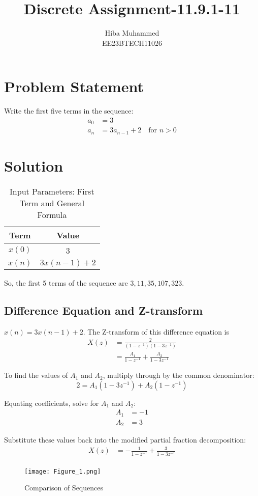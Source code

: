 \documentclass[12pt]{article}
\title{Discrete Assignment-11.9.1-11}
\author{Hiba Muhammed \\
        EE23BTECH11026}
\date{}
\begin{document}
\maketitle

\section*{Problem Statement}
Write the first five terms in the sequence:
\begin{align}
a_{0}  &= 3 \\
a_{n}  &= 3a_{n-1} + 2 \quad \text{for } n > 0
\end{align}

\section*{Solution}
\begin{table}[h]
  \centering
  \caption{Input Parameters: First Term and General Formula}
  \begin{tabular}{|c|c|}
    \hline
    \textbf{Term} & \textbf{Value} \\
    \hline
    \(x(0)\) & 3 \\
    \(x(n)\) & \(3x(n-1) + 2\) \\
    \hline
  \end{tabular}
\end{table}


So, the first 5 terms of the sequence are \(3, 11, 35, 107, 323\).

\subsection*{Difference Equation and Z-transform}
\(x(n) = 3x(n-1) + 2\). The Z-transform of this difference equation is
\begin{align}
X(z) &= \frac{2}{(1 - z^{-1})(1 - 3z^{-1})} \\
&= \frac{A_1}{1 - z^{-1}} + \frac{A_2}{1 - 3z^{-1}}
\end{align}

To find the values of \(A_1\) and \(A_2\), multiply through by the common denominator:
\begin{equation}
2 = A_1(1-3z^{-1}) + A_2(1-z^{-1})
\end{equation}

Equating coefficients, solve for \(A_1\) and \(A_2\):
\begin{align}
A_1 &= -1 \\
A_2 &= 3
\end{align}

Substitute these values back into the modified partial fraction decomposition:
\begin{align*}
X(z) &= -\frac{1}{1-z^{-1}} + \frac{3}{1-3z^{-1}} \\
\end{align*}



\begin{figure}[h]
    \centering
    \texttt{[image: Figure\_1.png]}
    \caption{Comparison of Sequences}
    \label{fig:comparison}
\end{figure}
\end{document}

